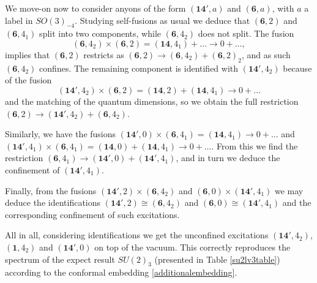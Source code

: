 \documentclass[11pt]{article}
\numberwithin{equation}{section}
\begin{document}
We move-on now to consider anyons of the form $(\mathbf{14}',a)$ and $(\mathbf{6},a)$, with $a$ a label in $SO(3)_{-4}$. Studying self-fusions as usual we deduce that $(\mathbf{6},2)$ and $(\mathbf{6},4_{1})$ split into two components, while $(\mathbf{6},4_{2})$ does not split. The fusion
\begin{equation}
    (\mathbf{6},4_{2}) \times (\mathbf{6},2) = (\mathbf{14},4_{1}) + \ldots \longrightarrow 0 + \ldots,
\end{equation}
implies that $(\mathbf{6},2)$ restricts as $(\mathbf{6},2) \to (\mathbf{6},4_{2}) + (\mathbf{6},2)_{2}$, and as such $(\mathbf{6},4_{2})$ confines. The remaining component is identified with $(\mathbf{14}',4_{2})$ because of the fusion
\begin{equation}
    (\mathbf{14}',4_{2}) \times (\mathbf{6},2) = (\mathbf{14},2) + (\mathbf{14},4_{1}) \longrightarrow 0 + \ldots
\end{equation}
and the matching of the quantum dimensions, so we obtain the full restriction $(\mathbf{6},2) \to (\mathbf{14}',4_{2}) + (\mathbf{6},4_{2})$.

Similarly, we have the fusions $(\mathbf{14}',0) \times (\mathbf{6}, 4_{1}) = (\mathbf{14},4_{1}) \to 0 + \ldots$ and $(\mathbf{14}', 4_{1}) \times (\mathbf{6},4_{1}) = (\mathbf{14},0) + (\mathbf{14},4_{1}) \to 0 + \ldots$. From this we find the restriction $(\mathbf{6},4_{1}) \to (\mathbf{14}',0) +(\mathbf{14}',4_{1})$, and in turn we deduce the confinement of $(\mathbf{14}',4_{1})$. 

Finally, from the fusions $(\mathbf{14}', 2) \times (\mathbf{6}, 4_{2})$ and $(\mathbf{6}, 0) \times (\mathbf{14}', 4_{1})$ we may deduce the identifications $(\mathbf{14}',2) \cong (\mathbf{6},4_{2})$ and $(\mathbf{6}, 0) \cong (\mathbf{14}', 4_{1})$ and the corresponding confinement of such excitations.

All in all, considering identifications we get the unconfined excitations $(\mathbf{14}', 4_{2})$, $(\mathbf{1},4_{2})$ and $(\mathbf{14}',0)$ on top of the vacuum. This correctly reproduces the spectrum of the expect result $SU(2)_{3}$ (presented in Table \ref{su2lv3table}) according to the conformal embedding \eqref{additionalembedding}.
















\end{document}

